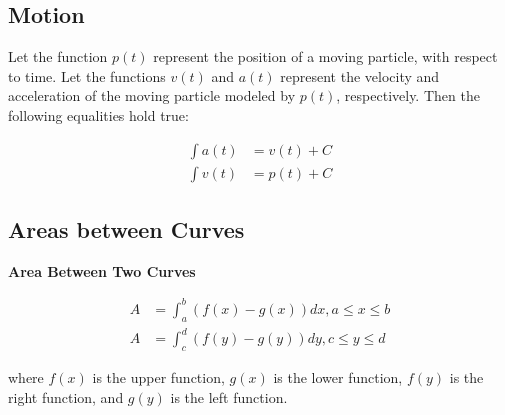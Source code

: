     \subsection{Motion}
        Let the function $p(t)$ represent the position of a moving particle, with respect to
        time. Let the functions $v(t)$ and $a(t)$ represent the velocity and acceleration
        of the moving particle modeled by $p(t)$, respectively. Then the following equalities
        hold true:

        \begin{align*}
            \int a(t) &= v(t) + C \\
            \int v(t) &= p(t) + C
        \end{align*}

    \pagebreak
    \subsection{Areas between Curves}
        \color{purple} \textbf{Area Between Two Curves} \color{black}

        \begin{align*}
            A   &= \int^b_a (f(x)-g(x)) dx, a\leq x\leq b \\
            A   &= \int^d_c (f(y)-g(y)) dy, c\leq y\leq d
        \end{align*}

        \noindent where $f(x)$ is the upper function, $g(x)$ is the lower function,
        $f(y)$ is the right function, and $g(y)$ is the left function.


